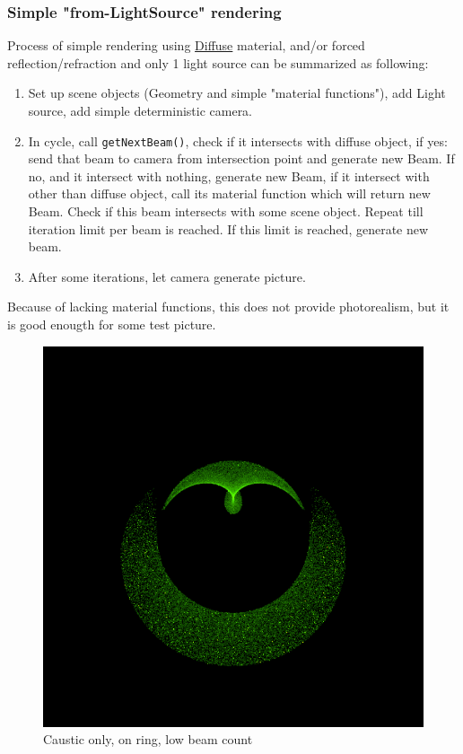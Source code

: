 \documentclass[12pt, letterpaper]{article}
\begin{document}
\subsubsection{Simple "from-LightSource" rendering}
Process of simple rendering using \href{https://en.wikipedia.org/wiki/Diffuse_reflection}{Diffuse} material, and/or forced reflection/refraction and only 1 light source can be summarized as following:
\begin{enumerate}
\item Set up scene objects (Geometry and simple "material functions"), add Light source, add simple deterministic camera.
\item In cycle, call \verb|getNextBeam()|, check if it intersects with diffuse object, if yes: send that beam to camera from intersection point and generate new Beam. If no, and it intersect with nothing, generate new Beam, if it intersect with other than diffuse object, call its material function which will return new Beam. Check if this beam intersects with some scene object. Repeat till iteration limit per beam is reached. If this limit is reached, generate new beam.
\item After some iterations, let camera generate picture.
\end{enumerate}
Because of lacking material functions, this does not provide photorealism, but it is good enougth for some test picture.
\begin{figure}[H]
\centering 
\includegraphics[scale=0.4]{Reflection55.png}
\caption{Caustic only, on ring, low beam count}
\end{figure}
\end{document}
